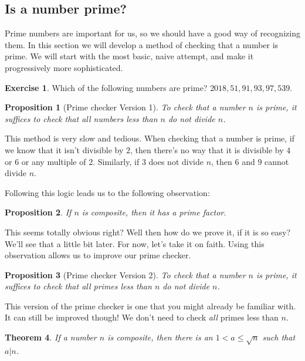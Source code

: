 \documentclass[11pt]{article}
\newtheorem{thm}{Theorem}
\newtheorem{prop}[thm]{Proposition}
\theoremstyle{definition}
\newtheorem{exercise}{Exercise}
\numberwithin{thm}{section}
\begin{document}
\subsection{Is a number prime?}

Prime numbers are important for us, so we should have a good way of recognizing them. In this section we will develop a method of checking that a number is prime. We will start with the most basic, naive attempt, and make it progressively more sophisticated.

\begin{exercise} Which of the following numbers are prime? $2018, 51, 91, 93, 97, 539$.
\end{exercise}

\begin{prop}[Prime checker Version 1] To check that a number $n$ is prime, it suffices to check that all numbers less than $n$ do not divide $n$.
\end{prop}

This method is very slow and tedious. When checking that a number is prime, if we know that it isn't divisible by $2$, then there's no way that it is divisible by $4$ or $6$ or any multiple of $2$. Similarly, if $3$ does not divide $n$, then $6$ and $9$ cannot divide $n$.

Following this logic leads us to the following observation:

\begin{prop} If $n$ is composite, then it has a prime factor.
\end{prop}

This seems totally obvious right? Well then how do we prove it, if it is so easy? We'll see that a little bit later. For now, let's take it on faith. Using this observation allows us to improve our prime checker.

\begin{prop}[Prime checker Version 2] To check that a number $n$ is prime, it suffices to check that all \textit{primes} less than $n$ do not divide $n$.
\end{prop}

This version of the prime checker is one that you might already be familiar with.  It can still be improved though! We don't need to check \textit{all} primes less than $n$.

\begin{thm} If a number $n$ is composite, then there is an $1 < a \leq \sqrt{n}$ such that $a | n$.
\end{thm}
\end{document}
